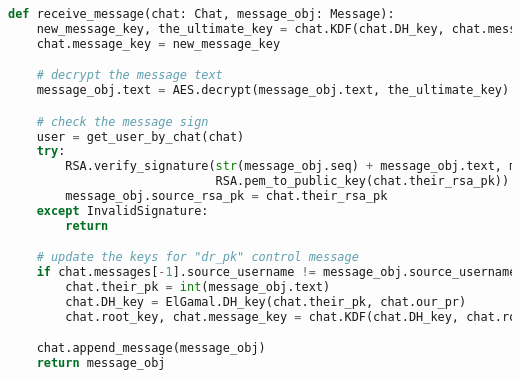 \begin{latin}
\begin{lstlisting}[firstnumber=414 , language=Python]
def receive_message(chat: Chat, message_obj: Message):
    new_message_key, the_ultimate_key = chat.KDF(chat.DH_key, chat.message_key)
    chat.message_key = new_message_key

    # decrypt the message text
    message_obj.text = AES.decrypt(message_obj.text, the_ultimate_key)

    # check the message sign
    user = get_user_by_chat(chat)
    try:
        RSA.verify_signature(str(message_obj.seq) + message_obj.text, message_obj.signature,
                             RSA.pem_to_public_key(chat.their_rsa_pk))
        message_obj.source_rsa_pk = chat.their_rsa_pk
    except InvalidSignature:
        return

    # update the keys for "dr_pk" control message
    if chat.messages[-1].source_username != message_obj.source_username:
        chat.their_pk = int(message_obj.text)
        chat.DH_key = ElGamal.DH_key(chat.their_pk, chat.our_pr)
        chat.root_key, chat.message_key = chat.KDF(chat.DH_key, chat.root_key)

    chat.append_message(message_obj)
    return message_obj
\end{lstlisting}
\end{latin}

